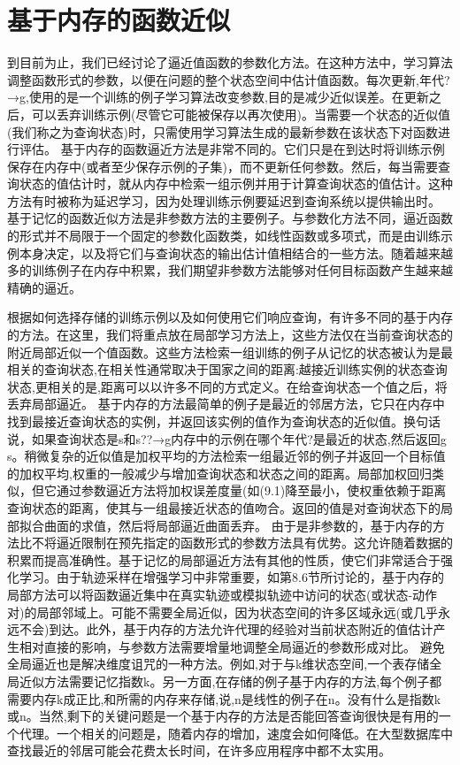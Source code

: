 {\section{基于内存的函数近似}

到目前为止，我们已经讨论了逼近值函数的参数化方法。在这种方法中，学习算法调整函数形式的参数，以便在问题的整个状态空间中估计值函数。每次更新,年代?→g,使用的是一个训练的例子学习算法改变参数,目的是减少近似误差。在更新之后，可以丢弃训练示例(尽管它可能被保存以再次使用)。当需要一个状态的近似值(我们称之为查询状态)时，只需使用学习算法生成的最新参数在该状态下对函数进行评估。
基于内存的函数逼近方法是非常不同的。它们只是在到达时将训练示例保存在内存中(或者至少保存示例的子集)，而不更新任何参数。然后，每当需要查询状态的值估计时，就从内存中检索一组示例并用于计算查询状态的值估计。这种方法有时被称为延迟学习，因为处理训练示例要延迟到查询系统以提供输出时。
基于记忆的函数近似方法是非参数方法的主要例子。与参数化方法不同，逼近函数的形式并不局限于一个固定的参数化函数类，如线性函数或多项式，而是由训练示例本身决定，以及将它们与查询状态的输出估计值相结合的一些方法。随着越来越多的训练例子在内存中积累，我们期望非参数方法能够对任何目标函数产生越来越精确的逼近。

根据如何选择存储的训练示例以及如何使用它们响应查询，有许多不同的基于内存的方法。在这里，我们将重点放在局部学习方法上，这些方法仅在当前查询状态的附近局部近似一个值函数。这些方法检索一组训练的例子从记忆的状态被认为是最相关的查询状态,在相关性通常取决于国家之间的距离:越接近训练实例的状态查询状态,更相关的是,距离可以以许多不同的方式定义。在给查询状态一个值之后，将丢弃局部逼近。
基于内存的方法最简单的例子是最近的邻居方法，它只在内存中找到最接近查询状态的实例，并返回该实例的值作为查询状态的近似值。换句话说，如果查询状态是s和s??→g内存中的示例在哪个年代?是最近的状态,然后返回g s。稍微复杂的近似值是加权平均的方法检索一组最近邻的例子并返回一个目标值的加权平均,权重的一般减少与增加查询状态和状态之间的距离。局部加权回归类似，但它通过参数逼近方法将加权误差度量(如(9.1)降至最小，使权重依赖于距离查询状态的距离，使其与一组最接近状态的值吻合。返回的值是对查询状态下的局部拟合曲面的求值，然后将局部逼近曲面丢弃。
由于是非参数的，基于内存的方法比不将逼近限制在预先指定的函数形式的参数方法具有优势。这允许随着数据的积累而提高准确性。基于记忆的局部逼近方法有其他的性质，使它们非常适合于强化学习。由于轨迹采样在增强学习中非常重要，如第8.6节所讨论的，基于内存的局部方法可以将函数逼近集中在真实轨迹或模拟轨迹中访问的状态(或状态-动作对)的局部邻域上。可能不需要全局近似，因为状态空间的许多区域永远(或几乎永远不会)到达。此外，基于内存的方法允许代理的经验对当前状态附近的值估计产生相对直接的影响，与参数方法需要增量地调整全局逼近的参数形成对比。
避免全局逼近也是解决维度诅咒的一种方法。例如,对于与k维状态空间,一个表存储全局近似方法需要记忆指数k。另一方面,在存储的例子基于内存的方法,每个例子都需要内存k成正比,和所需的内存来存储,说,n是线性的例子在n。没有什么是指数k或n。当然,剩下的关键问题是一个基于内存的方法是否能回答查询很快是有用的一个代理。一个相关的问题是，随着内存的增加，速度会如何降低。在大型数据库中查找最近的邻居可能会花费太长时间，在许多应用程序中都不太实用。

}
